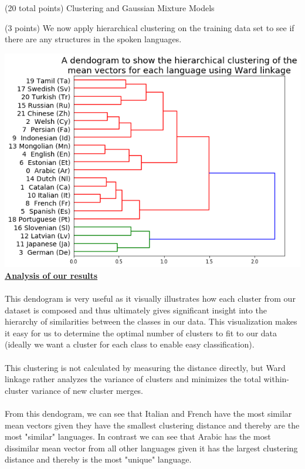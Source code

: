 \documentclass[12pt]{article}
\begin{document}
\begin{question}{(20 total points) Clustering and Gaussian Mixture Models}
\begin{subquestion}
   \end{subquestion}
   \begin{subquestion}{(3 points)
       We now apply hierarchical clustering on the training data set
       to see if there are any structures in the spoken languages.
     } \label{Q3.3}


     

      \begin{answerbox}{43em}
        \includegraphics[width=1\textwidth]{images/q33.png}
        \footnotesize{\textbf{\underline{Analysis of our results}}}\\
\\
        \scriptsize{
        This dendogram is very useful as it visually illustrates how each cluster from our dataset is composed and thus ultimately gives significant insight into the hierarchy of similarities between the classes in our data. This visualization makes it easy for us to determine the optimal number of clusters to fit to our data (ideally we want a cluster for each class to enable easy classification).\\
\\
        This clustering is not calculated by measuring the distance directly, but Ward linkage rather analyzes the variance of clusters and minimizes the total within-cluster variance of new cluster merges.\\
        \\
        From this dendogram, we can see that Italian and French have the most similar mean vectors given they have the smallest clustering distance and thereby are the most "similar" languages. In contrast we can see that Arabic has the most dissimilar mean vector from all other languages given it has the largest clustering distance and thereby is the most "unique" language.\\
}
\end{answerbox}
\end{subquestion}
\end{question}
\end{document}

